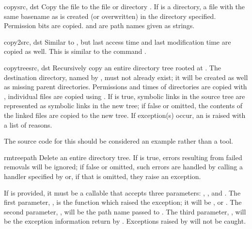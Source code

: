 \begin{funcdesc}{copy}{src, dst}
  Copy the file  to the file or directory .  If
   is a directory, a file with the same basename as  
  is created (or overwritten) in the directory specified.  Permission
  bits are copied.   and  are path names given as
  strings.
\end{funcdesc}

\begin{funcdesc}{copy2}{src, dst}
  Similar to , but last access time and last
  modification time are copied as well.  This is similar to the
  \UNIX{} command  .
\end{funcdesc}

\begin{funcdesc}{copytree}{src, dst}
  Recursively copy an entire directory tree rooted at .  The
  destination directory, named by , must not already exist;
  it will be created as well as missing parent directories.
  Permissions and times of directories are copied with ,
  individual files are copied using .  
  If  is true, symbolic links in
  the source tree are represented as symbolic links in the new tree;
  if false or omitted, the contents of the linked files are copied to
  the new tree.  If exception(s) occur, an  is raised
  with a list of reasons.

  The source code for this should be considered an example rather than 
  a tool.



\end{funcdesc}

\begin{funcdesc}{rmtree}{path}
  Delete an entire directory tree.
  If  is true,
  errors resulting from failed removals will be ignored; if false or
  omitted, such errors are handled by calling a handler specified by
   or, if that is omitted, they raise an exception.

  If  is provided, it must be a callable that accepts
  three parameters: , , and .
  The first parameter, , is the function which raised
  the exception; it will be ,  or
  .  The second parameter, , will be
  the path name passed to .  The third parameter,
  , will be the exception information return by
  .  Exceptions raised by  will
  not be caught.
\end{funcdesc}

